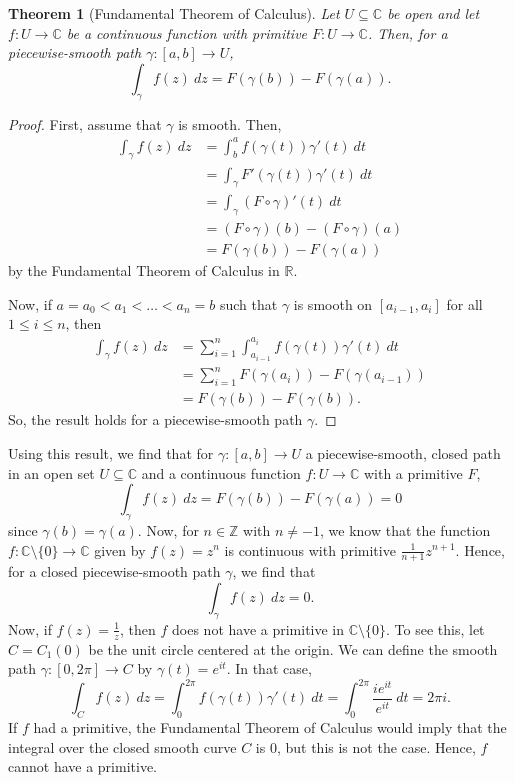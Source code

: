 \documentclass[a4paper, openany]{memoir}
\theoremstyle{definition}
\theoremstyle{plain}
\newtheorem{theorem}[definition]{Theorem}
\begin{document}
    \begin{theorem}[Fundamental Theorem of Calculus]
        Let $U \subseteq \mathbb{C}$ be open and let $f \colon U \to \mathbb{C}$ be a continuous function with primitive $F \colon U \to \mathbb{C}$. Then, for a piecewise-smooth path $\gamma \colon [a, b] \to U$,
        \[\int_\gamma f(z) \ dz = F(\gamma(b)) - F(\gamma(a)).\]
    \end{theorem}
    \begin{proof}
        First, assume that $\gamma$ is smooth. Then,
        \begin{align*}
            \int_\gamma f(z) \ dz &= \int_b^a f(\gamma(t)) \gamma'(t) \ dt \\
            &= \int_\gamma F'(\gamma(t)) \gamma'(t) \ dt \\
            &= \int_\gamma (F \circ \gamma)'(t) \ dt \\
            &= (F \circ \gamma)(b) - (F \circ \gamma)(a) \\
            &= F(\gamma(b)) - F(\gamma(a))
        \end{align*}
        by the Fundamental Theorem of Calculus in $\mathbb{R}$.

        Now, if $a = a_0 < a_1 < \dots < a_n = b$ such that $\gamma$ is smooth on $[a_{i-1}, a_i]$ for all $1 \leq i \leq n$, then
        \begin{align*}
            \int_\gamma f(z) \ dz &= \sum_{i=1}^n \int_{a_{i-1}}^{a_i} f(\gamma(t)) \gamma'(t) \ dt \\
            &= \sum_{i=1}^n F(\gamma(a_i)) - F(\gamma(a_{i-1})) \\
            &= F(\gamma(b)) - F(\gamma(b)).
        \end{align*}
        So, the result holds for a piecewise-smooth path $\gamma$.
    \end{proof}

    Using this result, we find that for $\gamma \colon [a, b] \to U$ a piecewise-smooth, closed path in an open set $U \subseteq \mathbb{C}$ and a continuous function $f \colon U \to \mathbb{C}$ with a primitive $F$, 
    \[\int_\gamma f(z) \ dz = F(\gamma(b)) - F(\gamma(a)) = 0\]
    since $\gamma(b) = \gamma(a)$. Now, for $n \in \mathbb{Z}$ with $n \neq -1$, we know that the function $f \colon \mathbb{C} \setminus \{0\} \to \mathbb{C}$ given by $f(z) = z^n$ is continuous with primitive $\frac{1}{n+1} z^{n+1}$. Hence, for a closed piecewise-smooth path $\gamma$, we find that
    \[\int_\gamma f(z) \ dz = 0.\]
    Now, if $f(z) = \frac{1}{z}$, then $f$ does not have a primitive in $\mathbb{C} \setminus \{0\}$. To see this, let $C = C_1(0)$ be the unit circle centered at the origin. We can define the smooth path $\gamma \colon [0, 2\pi] \to C$ by $\gamma(t) = e^{it}$. In that case,
    \[\int_C f(z) \ dz = \int_0^{2\pi} f(\gamma(t)) \gamma'(t) \ dt = \int_0^{2\pi} \frac{ie^{it}}{e^{it}} \ dt = 2\pi i.\]
    If $f$ had a primitive, the Fundamental Theorem of Calculus would imply that the integral over the closed smooth curve $C$ is $0$, but this is not the case. Hence, $f$ cannot have a primitive.
\end{document}

